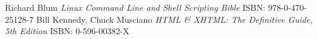 \begin{thebibliography}{9}
Richard Blum
\emph{Linux Command Line and Shell Scripting Bible}
ISBN: 978-0-470-25128-7
Bill Kennedy, Chuck Musciano
\emph{HTML \& XHTML: The Definitive Guide, 5th Edition} 
ISBN: 0-596-00382-X
\end{thebibliography}
